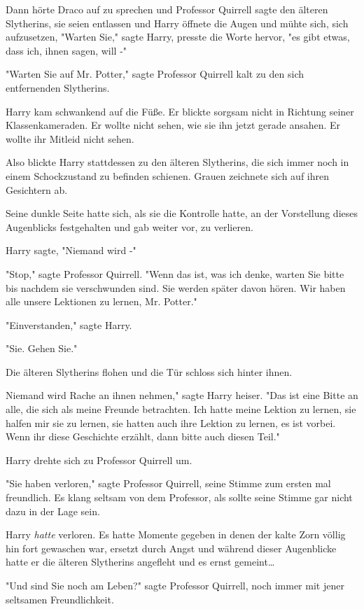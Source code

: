 {Dann hörte Draco auf zu sprechen und Professor Quirrell sagte den älteren Slytherins, sie seien entlassen und Harry öffnete die Augen und mühte sich, sich aufzusetzen, "Warten Sie," sagte Harry, presste die Worte hervor, "es gibt etwas, dass ich, ihnen sagen, will -"

"Warten Sie auf Mr. Potter," sagte Professor Quirrell kalt zu den sich entfernenden Slytherins.

Harry kam schwankend auf die Füße. Er blickte sorgsam nicht in Richtung seiner Klassenkameraden. Er wollte nicht sehen, wie sie ihn jetzt gerade ansahen. Er wollte ihr Mitleid nicht sehen.

Also blickte Harry stattdessen zu den älteren Slytherins, die sich immer noch in einem Schockzustand zu befinden schienen. Grauen zeichnete sich auf ihren Gesichtern ab.

Seine dunkle Seite hatte sich, als sie die Kontrolle hatte, an der Vorstellung dieses Augenblicks festgehalten und gab weiter vor, zu verlieren.

Harry sagte, "Niemand wird -"

"Stop," sagte Professor Quirrell. "Wenn das ist, was ich denke, warten Sie bitte bis nachdem sie verschwunden sind. Sie werden später davon hören. Wir haben alle unsere Lektionen zu lernen, Mr. Potter."

"Einverstanden," sagte Harry.

"Sie. Gehen Sie."

Die älteren Slytherins flohen und die Tür schloss sich hinter ihnen.

Niemand wird Rache an ihnen nehmen," sagte Harry heiser. "Das ist eine Bitte an alle, die sich als meine Freunde betrachten. Ich hatte meine Lektion zu lernen, sie halfen mir sie zu lernen, sie hatten auch ihre Lektion zu lernen, es ist vorbei. Wenn ihr diese Geschichte erzählt, dann bitte auch diesen Teil."

Harry drehte sich zu Professor Quirrell um.

"Sie haben verloren," sagte Professor Quirrell, seine Stimme zum ersten mal freundlich. Es klang seltsam von dem Professor, als sollte seine Stimme gar nicht dazu in der Lage sein.

Harry \emph{hatte} verloren. Es hatte Momente gegeben in denen der kalte Zorn völlig hin fort gewaschen war, ersetzt durch Angst und während dieser Augenblicke hatte er die älteren Slytherins angefleht und es ernst gemeint…

"Und sind Sie noch am Leben?" sagte Professor Quirrell, noch immer mit jener seltsamen Freundlichkeit.

}
